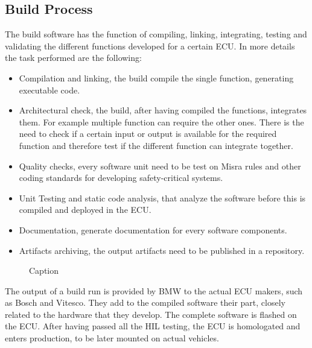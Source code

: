 \documentclass[../main.tex]{subfiles}
\begin{document}
\subsection{Build Process}
\label{subsection:Build process}
The build software has the function of compiling, linking, integrating, testing and validating the different functions developed for a certain ECU. In more details the task performed are the following:
\begin{itemize}
    \item Compilation and linking, the build compile the single function, generating executable code. 
    \item Architectural check, the build, after having compiled the functions, integrates them. For example multiple function can require the other ones. There is the need to check if a certain input or output is available for the required function and therefore test if the different function can integrate together.
    \item Quality checks, every software unit need to be test on Misra rules and other coding standards for developing safety-critical systems.
    \item Unit Testing and static code analysis, that analyze the software before this is compiled and deployed in the ECU.
    \item Documentation, generate documentation for every software components. 
    \item Artifacts archiving, the output artifacts need to be published in a repository.
\end{itemize}
\begin{figure}[H]
    \centering
    \caption{Caption}
    \label{fig:my_label}
\end{figure}
The output of a build run is provided by BMW to the actual ECU makers, such as Bosch and Vitesco. They add to the compiled software their part, closely related to the hardware that they develop. The complete software is flashed on the ECU. After having passed all the HIL testing, the ECU is homologated and enters production, to be later mounted on actual vehicles.
\end{document}

